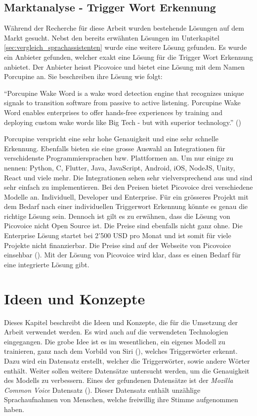 \documentclass[11pt,a4paper]{article}
\begin{document}
\subsection{Marktanalyse - Trigger Wort Erkennung}
Während der Recherche für diese Arbeit wurden bestehende Lösungen auf dem Markt gesucht. Nebst den 
bereits erwähnten Lösungen im Unterkapitel \ref{sec:vergleich_sprachassistenten} wurde eine weitere Lösung 
gefunden. Es wurde ein Anbieter gefunden, welcher exakt eine Lösung für die Trigger Wort Erkennung 
anbietet. Der Anbieter heisst Picovoice und bietet eine Lösung mit dem Namen Porcupine an. Sie 
beschreiben ihre Lösung wie folgt:

\begin{displayquote}
	``Porcupine Wake Word is a wake word detection engine that recognizes unique signals to
	transition software from passive to active listening. Porcupine Wake Word enables enterprises
	to offer hands-free experiences by training and deploying custom wake words like Big Tech -
	but with superior technology.'' (\cite{picovoice2023porcupine})
\end{displayquote}

\noindent \newline
Porcupine verspricht eine sehr hohe Genauigkeit und eine sehr schnelle Erkennung. Ebenfalls bieten
sie eine grosse Auswahl an Integrationen für verschidenste Programmiersprachen bzw. Plattformen an.
Um nur einige zu nennen: Python, C, Flutter, Java, JavaScript, Android, iOS, NodeJS, Unity, React
und viele mehr. Die Integrationen sehen sehr vielversprechend aus und sind sehr einfach zu
implementieren. Bei den Preisen bietet Picovoice drei verschiedene Modelle an. Individuell,
Developer und Enterprise. Für ein grösseres Projekt mit dem Bedarf nach einer individuellen
Triggerwort Erkennung könnte es genau die richtige Lösung sein. Dennoch ist gilt es zu erwähnen,
dass die Lösung von Picovoice nicht Open Source ist. Die Preise sind ebenfalls nicht ganz ohne.
Die Enterprise Lösung startet bei 2'500 USD pro Monat und ist somit für viele Projekte nicht
finanzierbar. Die Preise sind auf der Webseite von Picovoice einsehbar
(\cite{picovoice2023porcupine}). Mit der Lösung von Picovoice wird klar, dass es einen Bedarf für 
eine integrierte Lösung gibt.

\newpage \section{Ideen und Konzepte}
Dieses Kapitel beschreibt die Ideen und Konzepte, die für die Umsetzung der Arbeit verwendet
werden. Es wird auch auf die verwendeten Technologien eingegangen. Die grobe Idee ist es im 
wesentlichen, ein eigenes Modell zu trainieren, ganz nach dem Vorbild von Siri (\cite{siri2017hey}), 
welches Triggerwörter erkennt. Dazu wird ein Datensatz erstellt, welcher die Triggerwörter, 
sowie andere Wörter enthält. Weiter sollen weitere Datensätze untersucht werden, um die 
Genauigkeit des Modells zu verbessern. Eines der gefundenen Datensätze ist der 
\textit{Mozilla Common Voice} Datensatz (\cite{ardila2020common}). Dieser Datensatz enthält 
unzählige Sprachaufnahmen von Menschen, welche freiwillig ihre Stimme aufgenommen haben. 
\end{document}
